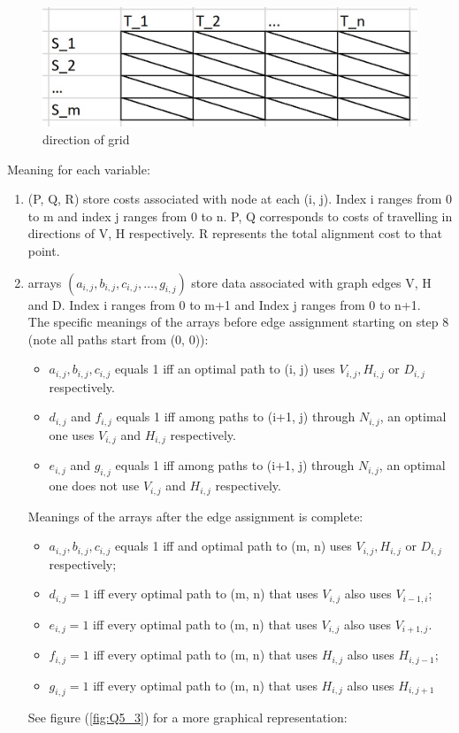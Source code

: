 \documentclass{article}
\begin{document}
	\begin{figure}[h]
		\centering
		\includegraphics{figures/q5_2.jpg}
		\caption{direction of grid}
		\label{fig:Q5_2}
		
	\end{figure}
	
	Meaning for each variable:
	\begin{enumerate}
		\item (P, Q, R) store costs associated with node at each (i, j). Index i ranges from 0 to m and index j ranges from 0 to n. P, Q corresponds to costs of travelling in directions of V, H respectively. R represents the total alignment cost to that point.
		\item arrays $ (a_{i, j}, b_{i, j}, c_{i, j}, \dots, g_{i, j}) $ store data associated with graph edges V, H and D. Index i ranges from 0 to m+1 and Index j ranges from 0 to n+1. \\
		The specific meanings of the arrays before edge assignment starting on step 8 (note all paths start from (0, 0)):
		\begin{itemize}
			\item $ a_{i, j}, b_{i, j}, c_{i, j}$ equals 1 iff an optimal path to (i, j) uses $ V_{i, j}, H_{i, j} $ or $ D_{i, j} $ respectively.
			\item $ d_{i, j} $ and $ f_{i, j} $ equals 1 iff among paths to (i+1, j) through $ N_{i, j} $, an optimal one uses $ V_{i, j} $ and $ H_{i, j} $ respectively.
			\item $ e_{i, j} $ and $ g_{i, j} $ equals 1 iff among paths to (i+1, j) through $ N_{i, j} $, an optimal one does not use $ V_{i, j} $ and $ H_{i, j} $ respectively.
		\end{itemize}
		Meanings of the arrays after the edge assignment is complete:
		\begin{itemize}
			\item $ a_{i, j}, b_{i, j}, c_{i, j}$ equals 1 iff and optimal path to (m, n) uses $ V_{i, j}, H_{i, j} $ or $ D_{i, j} $ respectively;
			\item $ d_{i, j} = 1 $ iff every optimal path to (m, n) that uses $ V_{i, j} $ also uses $ V_{i-1, i} $;
			\item $ e_{i, j} = 1 $ iff every optimal path to (m, n) that uses $ V_{i, j} $ also uses $ V_{i+1, j} $.
			\item $ f_{i, j} = 1 $ iff every optimal path to (m, n) that uses $ H_{i, j} $ also uses $ H_{i, j-1} $;
			\item $ g_{i, j} = 1 $ iff every optimal path to (m, n) that uses $ H_{i, j} $ also uses $ H_{i, j+1} $
		\end{itemize}
		See figure (\ref{fig:Q5_3}) for a more graphical representation:
		
		
	\end{enumerate}
\end{document}
